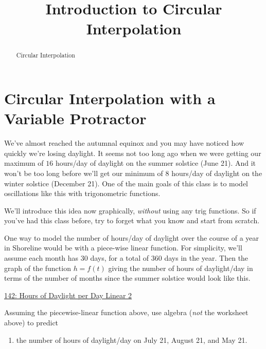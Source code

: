 \documentclass{ximera}
\title{Introduction to Circular Interpolation}
\begin{document}
\begin{abstract}
Circular Interpolation
\end{abstract}
\maketitle

\section{Circular Interpolation with a Variable Protractor}


\begin{example}  \label{Ex:KDreDFerdfdsa}
We've almost reached the autumnal equinox and you may have noticed how quickly we're losing daylight. It seems not too long ago when we were getting our maximum of $16$ hours/day of daylight on the summer solstice (June 21). And it won't be too long before we'll get our minimum of $8$ hours/day of daylight on the winter solstice (December 21). One of the main goals of this class is to model oscillations like this with trigonometric functions.

We'll introduce this idea now graphically, \emph{without} using any trig functions. So if you've had this class before, try to forget what you know and start from scratch.

One way to model the number of hours/day of daylight over the course of a year in Shoreline would be with a piece-wise linear function. For simplicity, we'll assume each month has 30 days, for a total of 360 days in the year. Then the graph of the function $h=f(t)$ giving the number of hours of daylight/day in terms of the number of months since the summer solstice would look like this.

\begin{onlineOnly}
    \begin{center}
\end{center}
\end{onlineOnly}

\href{https://www.desmos.com/calculator/swvhkxim4w}{142: Hours of Daylight per Day Linear 2}

\begin{question}  \label{Q98dfrdedsfdsf}

Assuming the piecewise-linear function above, use algebra (\emph{not} the worksheet above) to predict 
\begin{enumerate}
\item the number of hours of daylight/day on July 21, August 21, and May 21.


\end{enumerate}
\end{question}
\end{example}
\end{document}
